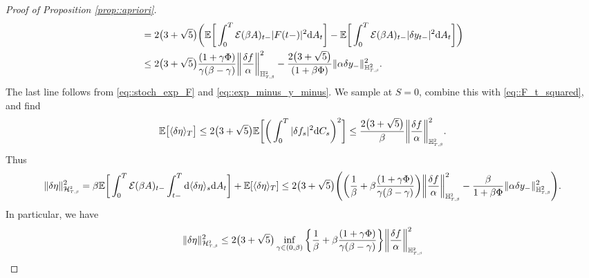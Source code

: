 \documentclass[10pt]{article} %
\newcommand\cE{\mathcal E}
\newcommand\cG{\mathcal G}
\newcommand\cH{\mathcal H}
\newcommand{\smalltext}[1]{\text{\fontsize{4}{4}\selectfont$#1$}}
\def \E{\mathbb{E}}
\def \H{\mathbb{H}}
\newcommand{\etaconst}{2\big(3 + \sqrt{5}\big)}
\def\d{\mathrm{d}}
\begin{document}
\begin{proof}[Proof of Proposition \ref{prop::apriori}]
\begin{align*}
	&= \etaconst \bigg(\E\bigg[ \int_0^T \cE(\beta A)_{t-} |F(t-)|^2  \d A_t \bigg]  - \E\bigg[ \int_0^T \cE(\beta A)_{t-}|\delta y_{t-}|^2 \d A_t \bigg]\bigg) \\
	&\leq \etaconst \frac{(1+\gamma\Phi)}{\gamma(\beta - \gamma)}\bigg\| \frac{\delta f}{\alpha} \bigg\|^2_{\H^{\smalltext{2}}_{\smalltext{T}\smalltext{,}\smalltext{\beta}}} - \frac{\etaconst}{(1+\beta\Phi)} \|\alpha \delta y_-\|^2_{\H^2_{\smalltext{T}\smalltext{,}\smalltext{\beta}}}.
\end{align*}
The last line follows from \eqref{eq::stoch_exp_F} and \eqref{eq::exp_minus_y_minus}. We sample  at $S = 0$, combine this with \eqref{eq::F_t_squared}, and find
\begin{equation*}
	\E \big[ \langle \delta\eta \rangle_T \big] \leq \etaconst \E \bigg[\bigg( \int_0^T |\delta f_s|^2 \d C_s \bigg)^2\bigg] \leq \frac{\etaconst}{\beta} \bigg\| \frac{\delta f}{\alpha} \bigg\|^2_{\H^{\smalltext{2}}_{\smalltext{T}\smalltext{,}\smalltext{\beta}}}.
\end{equation*}
Thus
\begin{equation*}
	\|\delta\eta\|^2_{\cH^\smalltext{2}_{\smalltext{T}\smalltext{,}\smalltext{\beta}}} 
	= \beta \E \bigg[ \int_0^T \cE(\beta A)_{t-} \int_{t-}^T \d \langle \delta\eta \rangle_s \d A_t \bigg] + \E [ \langle \delta\eta \rangle_T ] 
	\leq \etaconst\Bigg(\bigg(\frac{1}{\beta} +  \beta \frac{(1+\gamma\Phi)}{\gamma(\beta - \gamma)} \bigg)  \bigg\| \frac{\delta f}{\alpha} \bigg\|^2_{\H^{\smalltext{2}}_{\smalltext{T}\smalltext{,}\smalltext{\beta}}} -\frac{\beta}{1+\beta\Phi} \|\alpha \delta y_-\|^2_{\H^2_{\smalltext{T}\smalltext{,}\smalltext{\beta}}}\Bigg).
\end{equation*}
In particular, we have
\begin{equation*}
	\|\delta\eta\|^2_{\cH^\smalltext{2}_{\smalltext{T}\smalltext{,}\smalltext{\beta}}} \leq \etaconst \inf_{\gamma \in (0,\beta)}\bigg\{\frac{1}{\beta} +  \beta \frac{(1+\gamma\Phi)}{\gamma(\beta - \gamma)}\bigg\} \bigg\| \frac{\delta f}{\alpha} \bigg\|^2_{\H^{\smalltext{2}}_{\smalltext{T}\smalltext{,}\smalltext{\beta}}} 

\end{equation*}
\end{proof}
\end{document}
